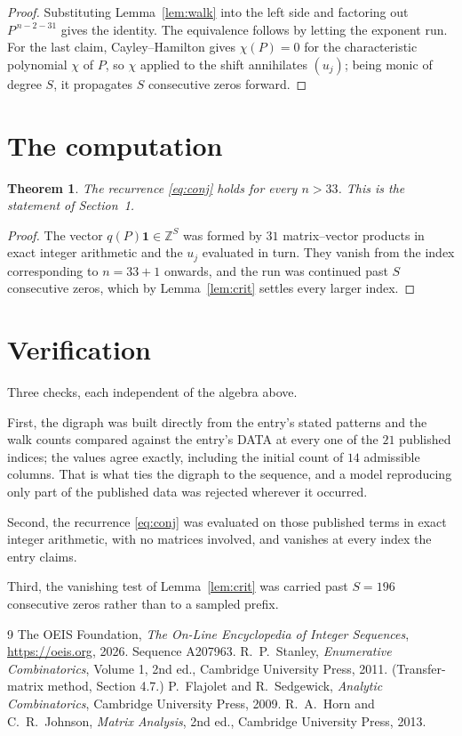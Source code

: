 \documentclass[11pt,a4paper]{article}
\theoremstyle{plain}
\newtheorem{theorem}{Theorem}
\theoremstyle{definition}
\begin{document}
\begin{proof}
Substituting Lemma~\ref{lem:walk} into the left side and factoring out
$P^{\,n-2-31}$ gives the identity. The equivalence follows by letting the exponent
run. For the last claim, Cayley--Hamilton gives $\chi(P)=0$ for the characteristic
polynomial $\chi$ of $P$, so $\chi$ applied to the shift annihilates $(u_j)$; being monic of
degree $S$, it propagates $S$ consecutive zeros forward.
\end{proof}

\section{The computation}

\begin{theorem}
The recurrence \eqref{eq:conj} holds for every $n>33$. This is the statement of
Section~1.
\end{theorem}

\begin{proof}
The vector $q(P)\mathbf{1}\in\mathbb{Z}^{S}$ was formed by $31$ matrix--vector
products in exact integer arithmetic and the $u_j$ evaluated in turn. They vanish from the
index corresponding to $n=33+1$ onwards, and the run was continued past $S$ consecutive
zeros, which by Lemma~\ref{lem:crit} settles every larger index.
\end{proof}

\section{Verification}

Three checks, each independent of the algebra above.

First, the digraph was built directly from the entry's stated patterns and the walk counts
compared against the entry's DATA at every one of the $21$ published indices; the
values agree exactly, including the initial count of $14$ admissible columns. That is
what ties the digraph to the sequence, and a model reproducing only part of the published
data was rejected wherever it occurred.

Second, the recurrence \eqref{eq:conj} was evaluated on those published terms in exact
integer arithmetic, with no matrices involved, and vanishes at every index the entry claims.

Third, the vanishing test of Lemma~\ref{lem:crit} was carried past $S=196$ consecutive
zeros rather than to a sampled prefix.

\begin{thebibliography}{9}
 The OEIS Foundation, \emph{The On-Line Encyclopedia of Integer
Sequences}, \url{https://oeis.org}, 2026. Sequence A207963.
 R.~P.~Stanley, \emph{Enumerative Combinatorics}, Volume 1, 2nd ed.,
Cambridge University Press, 2011. (Transfer-matrix method, Section 4.7.)
 P.~Flajolet and R.~Sedgewick, \emph{Analytic Combinatorics}, Cambridge
University Press, 2009.
 R.~A.~Horn and C.~R.~Johnson, \emph{Matrix Analysis}, 2nd ed., Cambridge
University Press, 2013.
\end{thebibliography}
\end{document}
